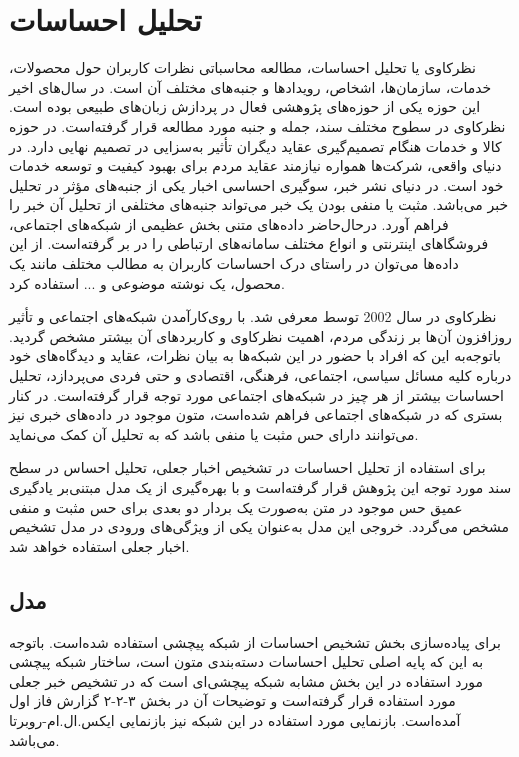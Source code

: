 \section{تحلیل احساسات}
نظرکاوی یا تحلیل احساسات، مطالعه محاسباتی نظرات کاربران حول محصولات، خدمات، سازمان‌ها، اشخاص، رویدادها و جنبه‌های مختلف آن است. در سال‌های اخیر این حوزه یکی از حوزه‌های پژوهشی فعال در پردازش زبان‌های طبیعی بوده است. نظرکاوی در سطوح مختلف سند، جمله و جنبه مورد مطالعه قرار گرفته‌است. در حوزه کالا و خدمات هنگام تصمیم‌گیری عقاید دیگران تأثیر به‌سزایی در تصمیم نهایی دارد. در دنیای واقعی، شرکت‌ها همواره نیازمند عقاید مردم برای بهبود کیفیت و توسعه خدمات خود است. در دنیای نشر خبر، سوگیری احساسی اخبار یکی از جنبه‌های مؤثر در تحلیل خبر می‌باشد. مثبت یا منفی بودن یک خبر می‌تواند جنبه‌های مختلفی از تحلیل آن خبر را فراهم آورد. درحال‌حاضر داده‌های متنی  بخش عظیمی از شبکه‌های اجتماعی، فروشگاهای اینترنتی و انواع مختلف سامانه‌های ارتباطی را در بر گرفته‌است. از این داده‌ها می‌توان در راستای درک احساسات کاربران به مطالب مختلف مانند یک محصول، یک نوشته موضوعی و ... استفاده کرد. 

نظر‌کاوی در سال 2002 توسط \citet{pang2002} معرفی شد. با روی‌کارآمدن شبکه‌های اجتماعی و تأثیر روزافزون آن‌ها بر زندگی مردم، اهمیت نظر‌کاوی و کاربردهای آن بیشتر مشخص گردید. باتوجه‌به این که افراد با حضور در این شبکه‌ها به بیان نظرات، عقاید و دیدگاه‌های خود درباره کلیه مسائل سیاسی، اجتماعی، فرهنگی، اقتصادی و حتی فردی می‌پردازد، تحلیل احساسات بیشتر از هر چیز در شبکه‌های اجتماعی مورد توجه قرار گرفته‌است. در کنار بستری که در شبکه‌های اجتماعی فراهم شده‌است، متون موجود در داده‌های خبری نیز می‌توانند دارای حس مثبت یا منفی باشد که به تحلیل آن کمک می‌نماید.

برای استفاده از تحلیل احساسات در تشخیص اخبار جعلی، تحلیل احساس در سطح سند مورد توجه این پژوهش قرار گرفته‌است و با بهره‌گیری از یک مدل مبتنی‌بر یادگیری عمیق حس موجود در متن به‌صورت یک بردار دو بعدی برای حس مثبت و منفی مشخص می‌گردد. خروجی این مدل به‌عنوان یکی از ویژگی‌های ورودی در مدل تشخیص اخبار جعلی استفاده خواهد شد.

\subsection{مدل}
برای پیاده‌سازی بخش تشخیص احساسات از شبکه پیچشی استفاده شده‌است. باتوجه‌ به این که پایه اصلی تحلیل احساسات دسته‌بندی متون است، ساختار شبکه پیچشی مورد استفاده در این بخش مشابه شبکه پیچشی‌ای است که در تشخیص خبر جعلی مورد استفاده قرار گرفته‌است و توضیحات آن در بخش ۳-۲-۲ گزارش فاز اول آمده‌است.  بازنمایی مورد استفاده در این شبکه نیز بازنمایی ایکس.ال.ام-روبرتا می‌باشد.

